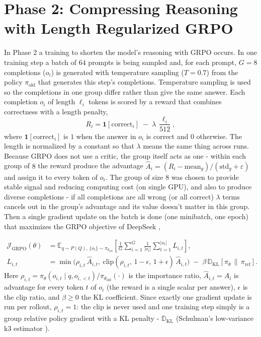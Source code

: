 \documentclass{article}
\begin{document}
\section{Phase 2: Compressing Reasoning with Length Regularized GRPO}
In Phase 2 a training to shorten the model's reasoning with GRPO occurs. In one training step a batch of $64$ prompts is being sampled and, for each prompt, $G=8$ completions ($o_i$) is generated with temperature sampling ($T=0.7$) from the policy $\pi_{\text{old}}$ that generates this step's completions. Temperature sampling is used so the completions in one group differ rather than give the same answer. Each completion $o_i$ of length $\ell_i$ tokens is scored by a reward that combines correctness with a length penalty,
\[ R_i = \mathbf{1}[\text{correct}_i] \;-\; \lambda\,\frac{\ell_i}{512}, \]
where $\mathbf{1}[\text{correct}_i]$ is $1$ when the answer in $o_i$ is correct and $0$ otherwise. The length is normalized by a constant so that $\lambda$ means the same thing across runs. Because GRPO does not use a critic, the group itself acts as one - within each group of $8$ the reward produce the advantage $\hat{A}_i=(R_i-\mathrm{mean}_g)/(\mathrm{std}_g+\varepsilon)$ and assign it to every token of $o_i$. The group of size $8$ was chosen to  provide stable signal and reducing computing cost (on single GPU),  and also to produce diverse completions - if all completions are all wrong (or all correct) $\lambda$ terms cancels out in the group's advantage and its value doesn't matter in this group. Then a single gradient update on the batch is done (one minibatch, one epoch) that maximizes the GRPO objective of DeepSeek \cite{shao2024deepseekmath},


\begin{equation*}
\begin{aligned}
\mathcal{J}_{\mathrm{GRPO}}(\theta) &= \mathbb{E}_{q \sim P(Q),\,\{o_i\}\sim\pi_{\theta_{\mathrm{old}}}}\!\left[\frac{1}{G}\sum_{i=1}^{G}\frac{1}{|o_i|}\sum_{t=1}^{|o_i|} L_{i,t}\right], \\[2pt]
L_{i,t} &= \min\!\big(\rho_{i,t}\,\hat A_{i,t},\ \mathrm{clip}(\rho_{i,t},\,1{-}\epsilon,\,1{+}\epsilon)\,\hat A_{i,t}\big)\;-\;\beta\,\mathbb{D}_{\mathrm{KL}}\!\left[\pi_\theta\,\|\,\pi_{\mathrm{ref}}\right].
\end{aligned}
\end{equation*}
Here $\rho_{i,t}=\pi_\theta(o_{i,t}\mid q,o_{i,<t})/\pi_{\theta_{\mathrm{old}}}(\cdot)$ is the importance ratio, $\hat A_{i,t}=\hat A_i$ is advantage for every token $t$ of $o_i$ (the reward is a single scalar per answer), $\epsilon$ is the clip ratio, and $\beta\ge 0$ the KL coefficient. Since exactly one gradient update is run per rollout, $\rho_{i,t}=1$: the clip is never used and one training step simply is a group relative policy gradient with a KL penalty - $\mathbb{D}_{\mathrm{KL}}$ (Schulman's low-variance k3 estimator \cite{k3}).
\end{document}
